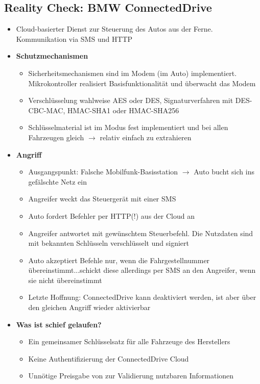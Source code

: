 \subsection{Reality Check: BMW ConnectedDrive}
\begin{itemize}
	\item Cloud-basierter Dienst zur Steuerung des Autos aus der Ferne. Kommunikation via SMS und HTTP
	\item \textbf{Schutzmechanismen}
	\begin{itemize}
		\item Sicherheitsmechanismen sind im Modem (im Auto) implementiert. Mikrokontroller realisiert Basisfunktionalität und überwacht das Modem
		\item Verschlüsselung wahlweise AES oder DES, Signaturverfahren mit DES-CBC-MAC, HMAC-SHA1 oder HMAC-SHA256
		\item Schlüsselmaterial ist im Modus fest implementiert und bei allen Fahrzeugen gleich \(\rightarrow\) relativ einfach zu extrahieren
	\end{itemize}
	\item \textbf{Angriff}
	\begin{itemize}
		\item Ausgangspunkt: Falsche Mobilfunk-Basisstation \(\rightarrow\) Auto bucht sich ins gefälschte Netz ein
		\item Angreifer weckt das Steuergerät mit einer SMS
		\item Auto fordert Befehler per HTTP(!) aus der Cloud an
		\item Angreifer antwortet mit gewünschtem Steuerbefehl. Die Nutzdaten sind mit bekannten Schlüsseln verschlüsselt und signiert
		\item Auto akzeptiert Befehle nur, wenn die Fahrgestellnummer übereinstimmt...schickt diese allerdings per SMS an den Angreifer, wenn sie nicht übereinstimmt
		\item Letzte Hoffnung: ConnectedDrive kann deaktiviert werden, ist aber über den gleichen Angriff wieder aktivierbar
	\end{itemize}
	\item \textbf{Was ist schief gelaufen?}
	\begin{itemize}
		\item Ein gemeinsamer Schlüsselsatz für alle Fahrzeuge des Herstellers
		\item Keine Authentifizierung der ConnectedDrive Cloud
		\item Unnötige Preisgabe von zur Validierung nutzbaren Informationen
	\end{itemize}
\end{itemize}


